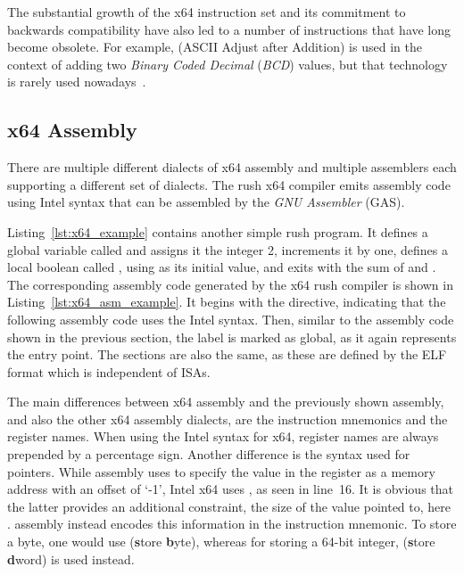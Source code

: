 The substantial growth of the x64 instruction set and its commitment to backwards compatibility have also led to a number of instructions that have long become obsolete.
For example,  (ASCII Adjust after Addition) is used in the context of adding two \emph{Binary Coded Decimal} (\emph{BCD}) values, but that technology is rarely used nowadays~\cite[p.~4]{Patterson2017}.

\subsection{x64 Assembly}


There are multiple different dialects of x64 assembly and multiple assemblers each supporting a different set of dialects.
The rush x64 compiler emits assembly code using Intel syntax that can be assembled by the \emph{GNU Assembler} (GAS).

Listing~\ref{lst:x64_example} contains another simple rush program.
It defines a global variable called  and assigns it the integer 2, increments it by one, defines a local boolean called , using  as its initial value, and exits with the sum of  and .
The corresponding assembly code generated by the x64 rush compiler is shown in Listing~\ref{lst:x64_asm_example}.
It begins with the  directive, indicating that the following assembly code uses the Intel syntax.
Then, similar to the \riscv{} assembly code shown in the previous section, the  label is marked as global, as it again represents the entry point.
The sections are also the same, as these are defined by the ELF format which is independent of ISAs.


The main differences between x64 assembly and the previously shown \riscv{} assembly, and also the other x64 assembly dialects, are the instruction mnemonics and the register names.
When using the Intel syntax for x64, register names are always prepended by a percentage sign.
Another difference is the syntax used for pointers.
While \riscv{} assembly uses  to specify the value in the  register as a memory address with an offset of `-1', Intel x64 uses , as seen in line~16.
It is obvious that the latter provides an additional constraint, the size of the value pointed to, here .
\riscv{} assembly instead encodes this information in the instruction mnemonic.
To store a byte, one would use  (\textbf{s}tore \textbf{b}yte), whereas for storing a 64-bit integer,  (\textbf{s}tore \textbf{d}word) is used instead.

